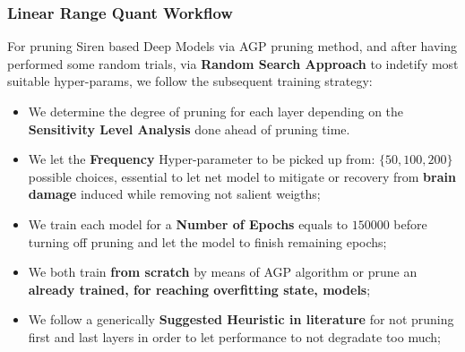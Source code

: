 



\begin{frame}
\frametitle{Linear Range Quant Workflow}
For pruning Siren based Deep Models via AGP pruning method, and after having performed some random trials, via \textbf{Random Search Approach} to indetify most suitable hyper-params, we follow the subsequent training strategy:
\begin{itemize}
\item We determine the degree of pruning for each layer depending on the \textbf{Sensitivity Level Analysis} done ahead of pruning time.
\item We let the \textbf{Frequency} Hyper-parameter to be picked up from: $\{50, 100, 200\}$ possible choices, essential to let net model to mitigate or recovery from \textbf{brain damage} induced while removing not salient weigths;
\item We train each model for a \textbf{Number of Epochs} equals to $150000$ before turning off pruning and let the model to finish remaining epochs;
\item We both train \textbf{from scratch} by means of AGP algorithm or prune an \textbf{already trained, for reaching overfitting state, models};
\item We follow a generically \textbf{Suggested Heuristic in literature} for not pruning first and last layers in order to let performance to not degradate too much;
\end{itemize}

\end{frame}
